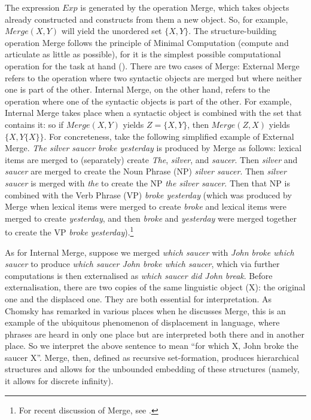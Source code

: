 The expression $Exp$ is generated by the operation Merge, which takes objects already constructed and constructs from them a new object. So, for example, $Merge (X,Y)$ will yield the unordered set $\{X,Y\}$. The structure-building operation Merge follows the principle of Minimal Computation (compute and articulate as little as possible), for it is the simplest possible computational operation for the task at hand (\citealt{BerwickChomsky2016,Chomsky2016a}). There are two cases of Merge: External Merge refers to the operation where two syntactic objects are merged but where neither one is part of the other. Internal Merge, on the other hand, refers to the operation where one of the syntactic objects is part of the other. For example, Internal Merge takes place when a syntactic object is combined with the set that contains it: so if $Merge (X,Y)$ yields $Z=\{X,Y\}$, then $Merge (Z,X)$ yields $\{X,Y\{X\}\}$. For concreteness, take the following simplified example of External Merge. \textit{The silver saucer broke yesterday} is produced by Merge as follows: lexical items are merged to (separately) create \textit{The}, \textit{silver}, and \textit{saucer}. Then \textit{silver} and \textit{saucer} are merged to create the Noun Phrase (NP) \textit{silver saucer}. Then \textit{silver saucer} is merged with \textit{the} to create the NP \textit{the silver saucer}. Then that NP is combined with the Verb Phrase (VP) \textit{broke yesterday} (which was produced by Merge when lexical items were merged to create \textit{broke} and lexical items were merged to create \textit{yesterday}, and then \textit{broke} and \textit{yesterday} were merged together to create the VP \textit{broke yesterday}).\footnote{For recent discussion of Merge, see \citet{Collins2017,ChomskyGallegoOtt2019}.}

As for Internal Merge, suppose we merged \textit{which saucer} with \textit{John broke which saucer} to produce \textit{which saucer John broke which saucer}, which via further computations is then externalised as \textit{which saucer did John break}. Before externalisation, there are two copies of the same linguistic object (X): the original one and the displaced one. They are both essential for interpretation. As Chomsky has remarked in various places when he discusses Merge, this is an example of the ubiquitous phenomenon of displacement in language, where phrases are heard in only one place but are interpreted both there and in another place. So we interpret the above sentence to mean “for which X, John broke the saucer X”. Merge, then, defined as recursive set-formation, produces hierarchical structures and allows for the unbounded embedding of these structures (namely, it allows for discrete infinity).

